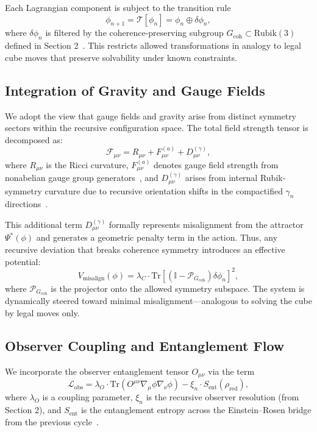 \documentclass[11pt]{article}
\begin{document}
Each Lagrangian component is subject to the transition rule
\[
\phi_{n+1} = \mathcal{T}[\phi_n] = \phi_n \oplus \delta \phi_n,
\]
where $\delta \phi_n$ is filtered by the coherence-preserving subgroup $G_{\text{coh}} \subset \text{Rubik}(3)$ defined in Section 2~\cite{joyner2008adventures}. This restricts allowed transformations in analogy to legal cube moves that preserve solvability under known constraints.

\subsection{Integration of Gravity and Gauge Fields}

We adopt the view that gauge fields and gravity arise from distinct symmetry sectors within the recursive configuration space. The total field strength tensor is decomposed as:
\[
\mathcal{F}_{\mu\nu} = R_{\mu\nu} + F_{\mu\nu}^{(a)} + D_{\mu\nu}^{(\gamma)},
\]
where $R_{\mu\nu}$ is the Ricci curvature, $F_{\mu\nu}^{(a)}$ denotes gauge field strength from nonabelian gauge group generators~\cite{peskin1995introduction}, and $D_{\mu\nu}^{(\gamma)}$ arises from internal Rubik-symmetry curvature due to recursive orientation shifts in the compactified $\gamma_n$ directions~\cite{joyner2008adventures}.

This additional term $D_{\mu\nu}^{(\gamma)}$ formally represents misalignment from the attractor $\Psi^*(\phi)$ and generates a geometric penalty term in the action. Thus, any recursive deviation that breaks coherence symmetry introduces an effective potential:
\[
V_{\text{misalign}}(\phi) = \lambda_C \cdot \mathrm{Tr}\left[ \left( \mathbb{I} - \mathcal{P}_{G_{\text{coh}}} \right) \delta \phi_n \right]^2,
\]
where $\mathcal{P}_{G_{\text{coh}}}$ is the projector onto the allowed symmetry subspace. The system is dynamically steered toward minimal misalignment—analogous to solving the cube by legal moves only.

\subsection{Observer Coupling and Entanglement Flow}

We incorporate the observer entanglement tensor $O_{\mu\nu}$ via the term
\[
\mathcal{L}_{\text{obs}} = \lambda_O \cdot \mathrm{Tr}\left( O^{\mu\nu} \nabla_\mu \phi \nabla_\nu \phi \right) - \xi_n \cdot S_{\text{ent}}(\rho_{\text{red}}),
\]
where $\lambda_O$ is a coupling parameter, $\xi_n$ is the recursive observer resolution (from Section 2), and $S_{\text{ent}}$ is the entanglement entropy across the Einstein–Rosen bridge from the previous cycle~\cite{maldacena2013cool, nielsen2010quantum}.
\end{document}

